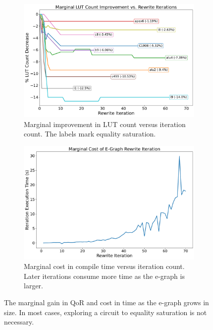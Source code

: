 \begin{figure}
    \begin{subfigure}{0.47\textwidth}
        \centering
        \includegraphics[width=\textwidth]{img/improvement.pdf}
        \caption{Marginal improvement in LUT count versus iteration count. The labels mark equality saturation.}\label{fig:marginal:improvement}
    \end{subfigure}
    \hfill\vspace{4mm}
    \begin{subfigure}{0.47\textwidth}
        \centering
        \includegraphics[width=\textwidth]{img/runtime_derivative.pdf}
        \caption{Marginal cost in compile time versus iteration count. Later iterations consume more time as the e-graph is larger.}\label{fig:marginal:runtime}
    \end{subfigure}
    \caption{The marginal gain in QoR and cost in time as the e-graph grows in size. In most cases, exploring a circuit to equality saturation is not necessary.}\label{fig:marginal}
\end{figure}

